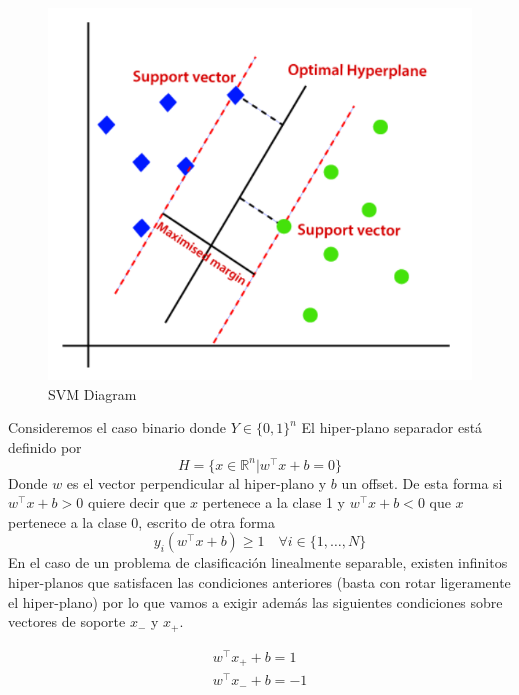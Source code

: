 \begin{figure}[H]
    \center
    \includegraphics[scale=0.3]{notebooks/ML/img/svm_diagram.png}
    \caption{SVM Diagram}
\end{figure}

Consideremos el caso binario donde $Y \in \{0,1\}^n$ El hiper-plano separador está definido por 
$$ H = \{ x \in \mathbb{R}^n | w^{\top}x + b = 0 \} $$ 
Donde $w$ es el vector perpendicular al hiper-plano y $b$ un offset. 
De esta forma si $w^{\top}x + b > 0$ quiere decir que $x$ pertenece a la clase 1 y $w^{\top}x + b < 0$ que $x$ pertenece a la clase 0, escrito de otra forma 
$$y_i(w^{\top}x+b) \geq 1 \quad \forall i \in \{ 1 , \dots , N \}$$
En el caso de un problema de clasificación linealmente separable, existen infinitos hiper-planos que satisfacen las condiciones anteriores (basta con rotar ligeramente el hiper-plano) por lo que vamos a exigir además las siguientes condiciones sobre vectores de soporte $x_{-}$ y $x_{+}$. 

\begin{equation*}
\begin{split}
w^{\top}x_{+} + b = 1 \\
w^{\top}x_{-} + b = -1
\end{split}
\end{equation*} 

